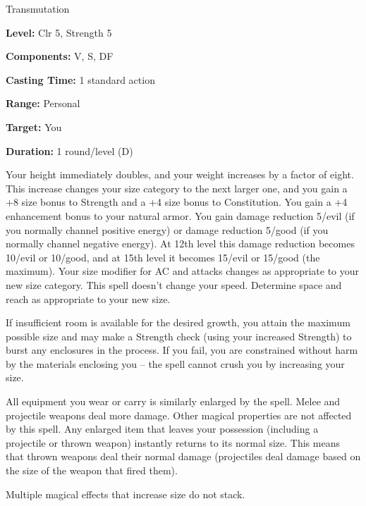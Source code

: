 
Transmutation

\textbf{Level:} Clr 5, Strength 5

\textbf{Components:} V, S, DF

\textbf{Casting Time:} 1 standard action

\textbf{Range:} Personal

\textbf{Target:} You

\textbf{Duration:} 1 round/level (D)

Your height immediately doubles, and your weight increases by a factor of eight. 
This increase changes your size category to the next larger one, and you gain a 
+8 size bonus to Strength and a +4 size bonus to Constitution. You gain a +4 enhancement 
bonus to your natural armor. You gain damage reduction 5/evil (if you normally 
channel positive energy) or damage reduction 5/good (if you normally channel negative 
energy). At 12th level this damage reduction becomes 10/evil or 10/good, and at 
15th level it becomes 15/evil or 15/good (the maximum). Your size modifier for 
AC and attacks changes as appropriate to your new size category. This spell doesn't 
change your speed.  Determine space and reach as appropriate to your new size.

If insufficient room is available for the desired growth, you attain the maximum 
possible size and may make a Strength check (using your increased Strength) to 
burst any enclosures in the process. If you fail, you are constrained without harm 
by the materials enclosing you --  the spell cannot crush you by increasing your 
size.

All equipment you wear or carry is similarly enlarged by the spell. Melee and projectile 
weapons deal more damage. Other magical properties are not affected by this spell. 
Any enlarged item that leaves your possession (including a projectile or thrown 
weapon) instantly returns to its normal size. This means that thrown weapons deal 
their normal damage (projectiles deal damage based on the size of the weapon that 
fired them).

Multiple magical effects that increase size do not stack.

